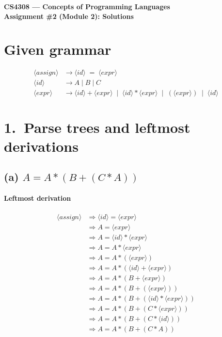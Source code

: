 \documentclass[11pt]{article}
\begin{document}
\begin{center}
{\Large \textbf{CS4308 --- Concepts of Programming Languages}}\\[4pt]
\textbf{Assignment \#2 (Module 2): Solutions}\\[2pt]
\end{center}

\section*{Given grammar}
\begin{align*}
\langle assign\rangle &\to \langle id\rangle\;=\;\langle expr\rangle\\
\langle id\rangle &\to A \mid B \mid C\\
\langle expr\rangle &\to \langle id\rangle + \langle expr\rangle \;\mid\; \langle id\rangle * \langle expr\rangle \;\mid\; (\langle expr\rangle) \;\mid\; \langle id\rangle
\end{align*}

\section*{1.\ Parse trees and leftmost derivations}
\subsection*{(a) \; $A = A * (B + (C * A))$}

\paragraph{Leftmost derivation}
\begin{align*}
\langle assign\rangle
&\Rightarrow \langle id\rangle = \langle expr\rangle\\
&\Rightarrow A = \langle expr\rangle\\
&\Rightarrow A = \langle id\rangle * \langle expr\rangle\\
&\Rightarrow A = A * \langle expr\rangle\\
&\Rightarrow A = A * (\langle expr\rangle)\\
&\Rightarrow A = A * (\langle id\rangle + \langle expr\rangle)\\
&\Rightarrow A = A * (B + \langle expr\rangle)\\
&\Rightarrow A = A * (B + (\langle expr\rangle))\\
&\Rightarrow A = A * (B + (\langle id\rangle * \langle expr\rangle))\\
&\Rightarrow A = A * (B + (C * \langle expr\rangle))\\
&\Rightarrow A = A * (B + (C * \langle id\rangle))\\
&\Rightarrow A = A * (B + (C * A))
\end{align*}
\end{document}
